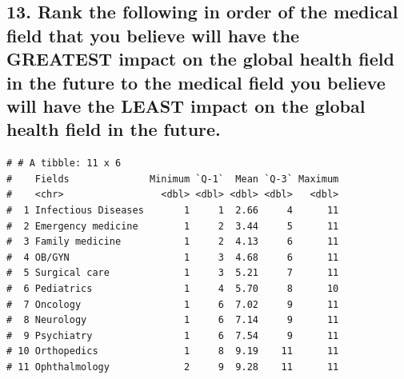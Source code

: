 \documentclass[
  letterpaper,
  DIV=11,
  numbers=noendperiod]{scrartcl}
\begin{document}
\hypertarget{rank-the-following-in-order-of-the-medical-field-that-you-believe-will-have-the-greatest-impact-on-the-global-health-field-in-the-future-to-the-medical-field-you-believe-will-have-the-least-impact-on-the-global-health-field-in-the-future.}{%
\subsection{13. Rank the following in order of the medical field that
you believe will have the GREATEST impact on the global health field in
the future to the medical field you believe will have the LEAST impact
on the global health field in the
future.}\label{rank-the-following-in-order-of-the-medical-field-that-you-believe-will-have-the-greatest-impact-on-the-global-health-field-in-the-future-to-the-medical-field-you-believe-will-have-the-least-impact-on-the-global-health-field-in-the-future.}}

\begin{verbatim}
# # A tibble: 11 x 6
#    Fields              Minimum `Q-1`  Mean `Q-3` Maximum
#    <chr>                 <dbl> <dbl> <dbl> <dbl>   <dbl>
#  1 Infectious Diseases       1     1  2.66     4      11
#  2 Emergency medicine        1     2  3.44     5      11
#  3 Family medicine           1     2  4.13     6      11
#  4 OB/GYN                    1     3  4.68     6      11
#  5 Surgical care             1     3  5.21     7      11
#  6 Pediatrics                1     4  5.70     8      10
#  7 Oncology                  1     6  7.02     9      11
#  8 Neurology                 1     6  7.14     9      11
#  9 Psychiatry                1     6  7.54     9      11
# 10 Orthopedics               1     8  9.19    11      11
# 11 Ophthalmology             2     9  9.28    11      11
\end{verbatim}

\newpage
\end{document}
